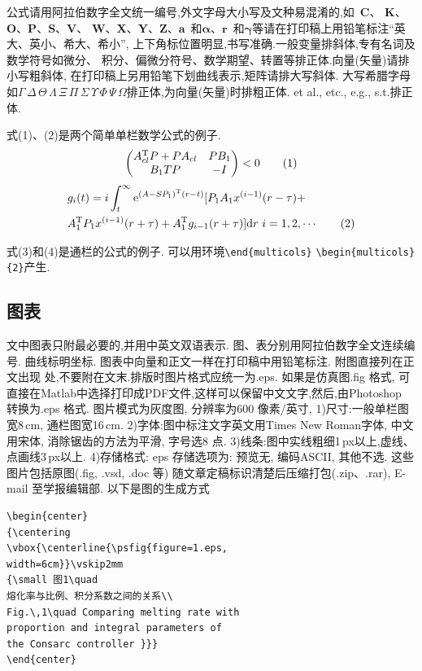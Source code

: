 \documentclass{aas}
\begin{document}
\begin{multicols}{2}
公式请用阿拉伯数字全文统一编号,外文字母大小写及文种易混淆的,如~{\bf C}、
{\bf K}、{\bf O}、{\bf P}、{\bf S}、{\bf V}、{\bf
W}、{\bf X}、{\bf Y}、{\bf Z}、${\pmb a}$~和${\pmb\alpha}$、${\pmb
r}$~和${\pmb\gamma}$等请在打印稿上用铅笔标注``英大、英小、希大、希小'',
上下角标位置明显,书写准确.一般变量排斜体,专有名词及数学符号如微分、
积分、偏微分符号、数学期望、转置等排正体.向量(矢量)请排小写粗斜体,
在打印稿上另用铅笔下划曲线表示,矩阵请排大写斜体.
大写希腊字母如$\Gamma\,\Delta\,\Theta\,\Lambda\,\Xi\,\Pi\,\Sigma\,
\Upsilon\,\Phi\,\Psi\,\Omega$排正体,为向量(矢量)时排粗正体. et al.,
etc., e.g., s.t.排正体.

式(1)、(2)是两个简单单栏数学公式的例子.
\begin{equation}
\begin{pmatrix}
A_{cl}^{\rm T}P+PA_{cl}&PB_1\\
B_1TP&-I
\end{pmatrix}
<0 \tag{1}
\end{equation}
\allowdisplaybreaks
\begin{align}
&{\sl g}_i(t)=i\int_t^\infty {\rm e}^{(A-SP_1)^{\rm T}(r-t)}[P_1A_1
x^{(i-1)}(r-\tau)+
\nonumber\\
&A_1^{\rm T}P_1 x^{(i-1)}(r+\tau)+A_1^ {\rm T}{\sl
g}_{i-1}(r+\tau)]{\rm d}r\ i=1,2,\cdots \tag{2}
\end{align}


式(3)和(4)是通栏的公式的例子.
可以用环境\verb|\end{multicols}| \verb|\begin{multicols}{2}|产生.

\subsection{图表}



文中图表只附最必要的,并用中英文双语表示.
图、表分别用阿拉伯数字全文连续编号. 曲线标明坐标.
图表中向量和正文一样在打印稿中用铅笔标注. 附图直接列在正文出现
处,不要附在文末.排版时图片格式应统一为.eps. 如果是仿真图.fig 格式,
可直接在Matlab中选择打印成PDF文件,这样可以保留中文文字,然后,由Photoshop 转换为.eps 格式.
图片模式为灰度图, 分辨率为600 像素/英寸, 1)尺寸:一般单栏图宽8\,cm, 通栏图宽16\,cm. 2)字体:图中标注文字英文用Times New Roman字体,
中文用宋体, 消除锯齿的方法为平滑, 字号选8 点. 3)线条:图中实线粗细1\,px以上,虚线、点画线3\,px以上.
4)存储格式: eps 存储选项为: 预览无, 编码ASCII, 其他不选.
这些图片包括原图(.fig, .vsd, .doc 等) 随文章定稿标识清楚后压缩打包(.zip、.rar), E-mail 至学报编辑部. 以下是图的生成方式
\begin{verbatim}
\begin{center}
{\centering
\vbox{\centerline{\psfig{figure=1.eps,
width=6cm}}\vskip2mm
{\small 图1\quad
熔化率与比例、积分系数之间的关系\\
Fig.\,1\quad Comparing melting rate with
proportion and integral parameters of
the Consarc controller }}}
\end{center}
\end{verbatim}








\end{multicols}
\end{document}
